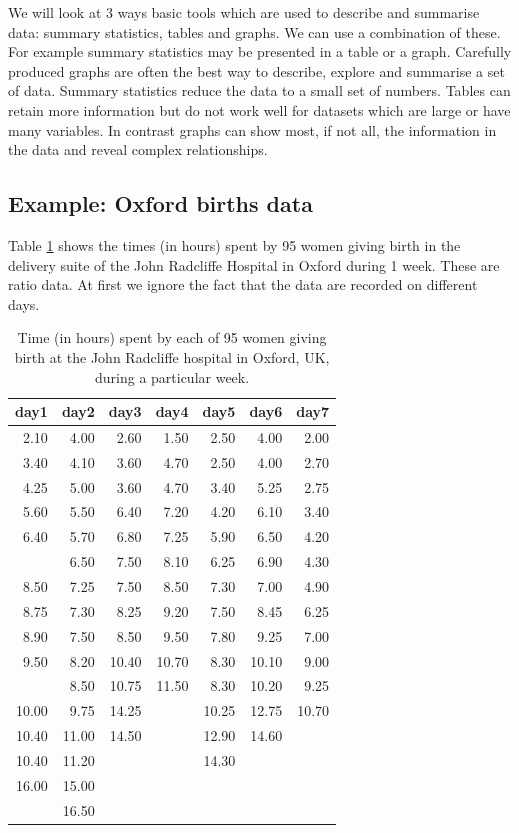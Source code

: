 \documentclass[
  11pt,
  british,
  openany, a4paper]{book}
\begin{document}
We will look at 3 ways basic tools which are used to describe and summarise data: summary statistics, tables and graphs. We can use a combination of these. For example summary statistics may be presented in a table or a graph. Carefully produced graphs are often the best way to describe, explore and summarise a set of data. Summary statistics reduce the data to a small set of numbers. Tables can retain more information but do not work well for datasets which are large or have many variables. In contrast graphs can show most, if not all, the information in the data and reveal complex relationships.

\hypertarget{example-oxford-births-data}{%
\subsection*{Example: Oxford births data}\label{example-oxford-births-data}}

Table \ref{tab:taboxbirths} shows the times (in hours) spent by 95 women giving birth in the delivery suite of the John Radcliffe Hospital in Oxford during 1 week. These are ratio data. At first we ignore the fact that the data are recorded on different days.

\begin{table}

\caption{\label{tab:taboxbirths}Time (in hours) spent by each of 95 women giving birth at the John 
Radcliffe hospital in Oxford, UK, during a particular week.}
\centering
\begin{tabular}[t]{rrrrrrr}
\toprule
day1 & day2 & day3 & day4 & day5 & day6 & day7\\
\midrule
2.10 & 4.00 & 2.60 & 1.50 & 2.50 & 4.00 & 2.00\\
3.40 & 4.10 & 3.60 & 4.70 & 2.50 & 4.00 & 2.70\\
4.25 & 5.00 & 3.60 & 4.70 & 3.40 & 5.25 & 2.75\\
5.60 & 5.50 & 6.40 & 7.20 & 4.20 & 6.10 & 3.40\\
6.40 & 5.70 & 6.80 & 7.25 & 5.90 & 6.50 & 4.20\\
\addlinespace
7.30 & 6.50 & 7.50 & 8.10 & 6.25 & 6.90 & 4.30\\
8.50 & 7.25 & 7.50 & 8.50 & 7.30 & 7.00 & 4.90\\
8.75 & 7.30 & 8.25 & 9.20 & 7.50 & 8.45 & 6.25\\
8.90 & 7.50 & 8.50 & 9.50 & 7.80 & 9.25 & 7.00\\
9.50 & 8.20 & 10.40 & 10.70 & 8.30 & 10.10 & 9.00\\
\addlinespace
9.75 & 8.50 & 10.75 & 11.50 & 8.30 & 10.20 & 9.25\\
10.00 & 9.75 & 14.25 &  & 10.25 & 12.75 & 10.70\\
10.40 & 11.00 & 14.50 &  & 12.90 & 14.60 & \\
10.40 & 11.20 &  &  & 14.30 &  & \\
16.00 & 15.00 &  &  &  &  & \\
\addlinespace
19.00 & 16.50 &  &  &  &  & \\
\bottomrule
\end{tabular}
\end{table}
\end{document}
